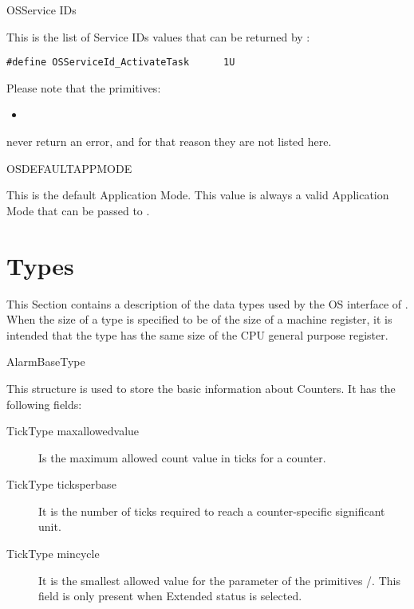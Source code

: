 \begin{constant}{OSService IDs}
  \begin{constantdescription}
    This is the list of Service IDs values that can be returned by
    :
    \begin {lstlisting}
#define OSServiceId_ActivateTask      1U
    \end{lstlisting}
    Please note that the primitives:
    \begin{itemize}                              \vspace{-2mm}
      \item {}        \vspace{-2mm}
    \end{itemize}
    never return an error, and for that reason they are not listed
    here.
  \end{constantdescription}
\end{constant}

\begin{constant}{OSDEFAULTAPPMODE}
  \begin{constantdescription}
    This is the default Application Mode. This value is always a valid
    Application Mode that can be passed to .
  \end{constantdescription}
\end{constant}


\pagebreak





\section{Types}
\label{sec:types}

This Section contains a description of the data types used by the OS
interface of \ee. When the size of a type is specified to be of the
size of a machine register, it is intended that the type has the same
size of the CPU general purpose register.

\begin{type}{AlarmBaseType}
  \begin{typedescription}
    This structure is used to store the basic information about
    Counters. It has the following fields:
    \begin{description}
    \item[TickType maxallowedvalue] Is the maximum allowed count value
      in ticks for a counter.
    \item[TickType ticksperbase] It is the number of ticks required to
      reach a counter-specific significant unit.
    \item[TickType mincycle] It is the smallest allowed value for the
       parameter of the primitives 
      /. This field is only
      present when Extended status is selected.
    \end{description}
  \end{typedescription}
\end{type}

